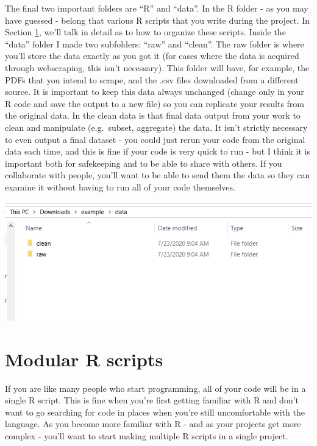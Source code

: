 \documentclass[
  12pt,
]{book}
\begin{document}
The final two important folders are ``R'' and ``data''. In the R folder - as you may have guessed - belong that various R scripts that you write during the project. In Section \ref{modular-r-scripts}, we'll talk in detail as to how to organize these scripts. Inside the ``data'' folder I made two subfolders: ``raw'' and ``clean''. The raw folder is where you'll store the data exactly as you got it (for cases where the data is acquired through webscraping, this isn't necessary). This folder will have, for example, the PDFs that you intend to scrape, and the .csv files downloaded from a different source. It is important to keep this data always unchanged (change only in your R code and save the output to a new file) so you can replicate your results from the original data. In the clean data is that final data output from your work to clean and manipulate (e.g.~subset, aggregate) the data. It isn't strictly necessary to even output a final dataset - you could just rerun your code from the original data each time, and this is fine if your code is very quick to run - but I think it is important both for safekeeping and to be able to share with others. If you collaborate with people, you'll want to be able to send them the data so they can examine it without having to run all of your code themselves.

\includegraphics{images/new_project_8.PNG}

\hypertarget{modular-r-scripts}{%
\section{Modular R scripts}\label{modular-r-scripts}}

If you are like many people who start programming, all of your code will be in a single R script. This is fine when you're first getting familiar with R and don't want to go searching for code in places when you're still uncomfortable with the language. As you become more familiar with R - and as your projects get more complex - you'll want to start making multiple R scripts in a single project.
\end{document}
